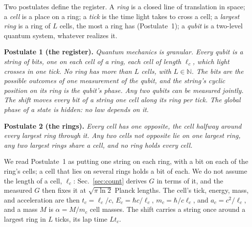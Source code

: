 \documentclass[aps,prd,twocolumn,superscriptaddress,nofootinbib,showkeys]{revtex4-2}
\makeatletter
\newcommand{\lc}{\ell_c}
\newcommand{\tc}{t_c}
\newcommand{\mc}{m_c}
\newcommand{\Ec}{E_c}
\newcommand{\ac}{a_c}
\def\section{\@startsection{section}{1}{\z@}{0.6cm \@plus1ex \@minus .2ex}{0.35cm}{\normalfont\small\bfseries}}
\makeatother
\begin{document}
\section{Postulates and Count}
\label{sec:postulates}

Two postulates define the register. A \emph{ring} is a closed line of translation in space; a \emph{cell} is a place on a ring; a \emph{tick} is the time light takes to cross a cell; a \emph{largest ring} is a ring of $L$ cells, the most a ring has (Postulate~1); a \emph{qubit} is a two-level quantum system, whatever realizes it.

\textbf{Postulate 1 (the register).} \emph{Quantum mechanics is granular. Every qubit is a string of bits, one on each cell of a ring, each cell of length $\lc$, which light crosses in one tick. No ring has more than $L$ cells, with $L\in\mathbb{N}$. The bits are the possible outcomes of one measurement of the qubit, and the string's cyclic position on its ring is the qubit's phase. Any two qubits can be measured jointly. The shift moves every bit of a string one cell along its ring per tick. The global phase of a state is hidden: no law depends on it.}

\textbf{Postulate 2 (the rings).} \emph{Every cell has one opposite, the cell halfway around every largest ring through it. Any two cells not opposite lie on one largest ring, any two largest rings share a cell, and no ring holds every cell.}

We read Postulate~1 as putting one string on each ring, with a bit on each of the ring's cells; a cell that lies on several rings holds a bit of each. We do not assume the length of a cell, $\lc$: Sec.~\ref{sec:count} derives $G$ in terms of it, and the measured $G$ then fixes it at $\sqrt{\pi\ln2}$ Planck lengths. The cell's tick, energy, mass, and acceleration are then $\tc = \lc/c$, $\Ec = \hbar c/\lc$, $\mc = \hbar/c\lc$, and $\ac = c^2/\lc$, and a mass $M$ is $\alpha = M/\mc$ cell masses. The shift carries a string once around a largest ring in $L$ ticks, its lap time $L\tc$.
\end{document}
